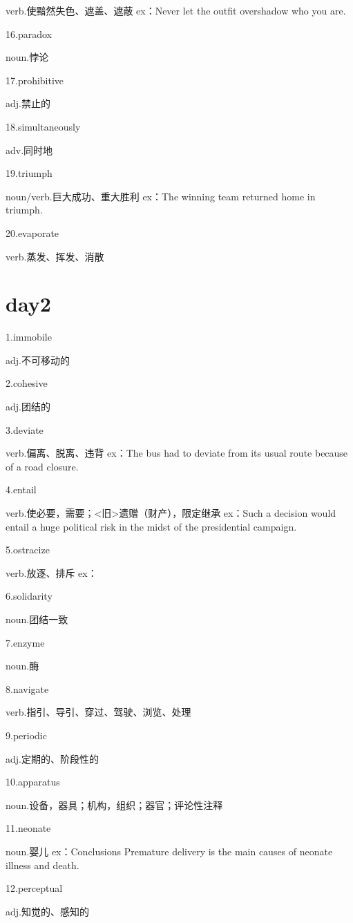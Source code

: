 \documentclass[a4paper, 10pt]{article}
\begin{document}
verb.使黯然失色、遮盖、遮蔽 ex：Never let the outfit overshadow who you are.

16.paradox

noun.悖论

17.prohibitive

adj.禁止的

18.simultaneously 

adv.同时地

19.triumph 

noun/verb.巨大成功、重大胜利 ex：The winning team returned home in triumph.

20.evaporate

verb.蒸发、挥发、消散

\section{day2}

1.immobile

adj.不可移动的

2.cohesive 

adj.团结的

3.deviate 

verb.偏离、脱离、违背 ex：The bus had to deviate from its usual route because of a road closure.

4.entail

verb.使必要，需要；<旧>遗赠（财产），限定继承 ex：Such a decision would entail a huge political risk in the midst of the presidential campaign.

5.ostracize 

verb.放逐、排斥 ex：

6.solidarity 

noun.团结一致

7.enzyme 

noun.酶

8.navigate

verb.指引、导引、穿过、驾驶、浏览、处理


9.periodic 

adj.定期的、阶段性的

10.apparatus

noun.设备，器具；机构，组织；器官；评论性注释

11.neonate 

noun.婴儿 ex：Conclusions Premature delivery is the main causes of neonate illness and death.

12.perceptual

adj.知觉的、感知的
\end{document}
